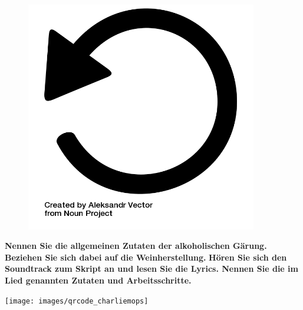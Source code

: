 \documentclass{scrartcl}  %
\begin{document}
\vspace{0.3cm}
		\begin{tcolorbox}[enhanced,
			colback=white,
			colframe=orange!60!red,
			fonttitle=\sffamily\bfseries\large, 
			title=Wiederholung,  %
			attach boxed title to top left={xshift=3.2mm,yshift=-0.50mm},
			boxed title style={skin=enhancedfirst jigsaw,size=small,arc=1mm,bottom=-1mm,colframe=orange!60!red,height=0.75cm},
			colbacktitle=orange!60!red,
			drop lifted shadow]	
			\begin{figure}  
				\centering
				\vspace{-14pt}  %
				\includegraphics[width=0.9\textwidth]{symbols/symbol_tex_review}
			\end{figure}
			
			\textbf{Nennen Sie die allgemeinen Zutaten der alkoholischen Gärung. Beziehen Sie sich dabei auf die Weinherstellung.} \newline
			\textbf{Hören Sie sich den Soundtrack zum Skript an und lesen Sie die Lyrics. Nennen Sie die im Lied genannten Zutaten und Arbeitsschritte.}
			\begin{center}
				\texttt{[image: images/qrcode\_charliemops]}
			\end{center}
			
		\end{tcolorbox}
		
\end{document}
